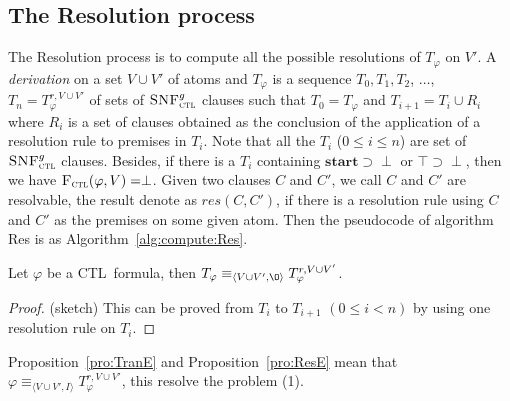 \documentclass[runningheads]{llncs}
\newcommand{\tuple}[1]{{\langle{#1}\rangle}}
\newcommand{\Mod}{\textit{Mod}}
\newcommand{\rto}{\rightarrow}
\newcommand{\lrto}{\leftrightarrow}
\newcommand{\Hm} {{\cal M}}
\newcommand{\start}{\textbf{start}}
\newcommand{\CTL}{\textrm{CTL}}
\newcommand{\ALL}{\textsc{a}}
\newcommand{\CTLsnf}{{\textsc{SNF}_{\textsc{ctl}}^g}}
\newcommand{\CTLforget}{{\textsc{F}_{\textsc{ctl}}}}
\begin{document}
\subsection{The Resolution process}
The Resolution process is to compute all the possible resolutions of $T_{\varphi}$ on $V'$.
A \emph{derivation} on a set $V\cup V'$ of atoms and $T_{\varphi}$ is a sequence $T_0, T_1, T_2$, $\dots$, $T_n=T_{\varphi}^{r,V \cup V'}$ of sets of $\CTLsnf$ clauses such that $T_0 = T_{\varphi}$ and $T_{i+1} = T_i \cup R_i$ where $R_i$ is a set of clauses obtained as the conclusion of the application of a resolution rule to premises in $T_i$.
Note that all the $T_i$ ($0 \leq i \leq n$) are set of $\CTLsnf$ clauses.
Besides, if there is a $T_i$ containing $\start\supset \perp$ or $\top\supset \perp$, then we have $\CTLforget(\varphi, V)=\perp$.
Given two clauses $C$ and $C'$, we call $C$ and $C'$ are resolvable, the result denote as $res(C,C')$, if there is a resolution rule using $C$ and $C'$ as the premises on some given atom.
Then the pseudocode of algorithm Res is as Algorithm~\ref{alg:compute:Res}.

\begin{proposition}\label{pro:ResE}
 Let $\varphi$ be a \CTL\ formula, then $T_{\varphi} \equiv_{\tuple{V \cup V', {\O}}} T_{\varphi}^{r,V \cup V'}$.
\end{proposition}
\begin{proof}(sketch)
This can be proved from $T_i$ to $T_{i+1}$ $(0\leq i < n)$ by using one resolution rule on $T_i$.
%
%
%
%
%
%
%

\end{proof}
Proposition~\ref{pro:TranE} and Proposition~\ref{pro:ResE} mean that $\varphi \equiv_{\tuple{V \cup V', I}} T_{\varphi}^{r,V \cup V'}$, this resolve the problem (1).
\end{document}

